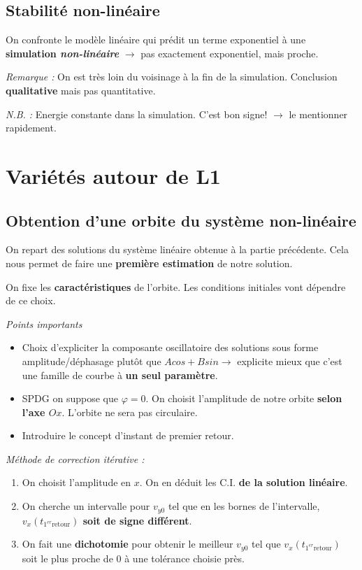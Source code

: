 \documentclass[12pt]{article}
\begin{document}
	
	\subsection{Stabilité non-linéaire}	
	On confronte le modèle linéaire qui prédit un terme exponentiel à une \textbf{simulation \textit{non-linéaire}} $\to$ pas exactement exponentiel, mais proche.
	
	\textit{Remarque :} On est très loin du voisinage à la fin de la simulation. Conclusion \textbf{qualitative} mais pas quantitative.
	
	\textit{N.B. :} Energie constante dans la simulation. C'est bon signe! $\to$ le mentionner rapidement.
	
	
	
	\clearpage
	\section{Variétés autour de L1}
	\subsection{Obtention d'une orbite du système non-linéaire}
	On repart des solutions du système linéaire obtenue à la partie précédente. Cela nous permet de faire une \textbf{première estimation} de notre solution. 
	
	On fixe les \textbf{caractéristiques} de l'orbite. Les conditions initiales vont dépendre de ce choix.
	
	\textit{Points importants}
	\begin{itemize}
		\item Choix d'expliciter la composante oscillatoire des solutions sous forme amplitude/déphasage plutôt que $Acos + Bsin \to$ explicite mieux que c'est une famille de courbe à \textbf{un seul paramètre}.
		\item SPDG on suppose que $\varphi = 0$. On choisit l'amplitude de notre orbite \textbf{selon l'axe $Ox$}. L'orbite ne sera pas circulaire.
		\item Introduire le concept d'instant de premier retour.
	\end{itemize}
	
	\bigskip
	
	\textit{Méthode de correction itérative :}
	\begin{enumerate}
		\item On choisit l'amplitude en $x$. On en déduit les C.I. \textbf{de la solution linéaire}.
		\item On cherche un intervalle pour $v_{y0}$ tel que en les bornes de l'intervalle, \textbf{$v_x(t_{1^{er}\text{retour}})$ soit de signe différent}.
		\item On fait une \textbf{dichotomie} pour obtenir le meilleur $v_{y0}$ tel que $v_x(t_{1^{er}\text{retour}})$ soit le plus proche de $0$ à une tolérance choisie près.
	\end{enumerate}
	
\end{document}
